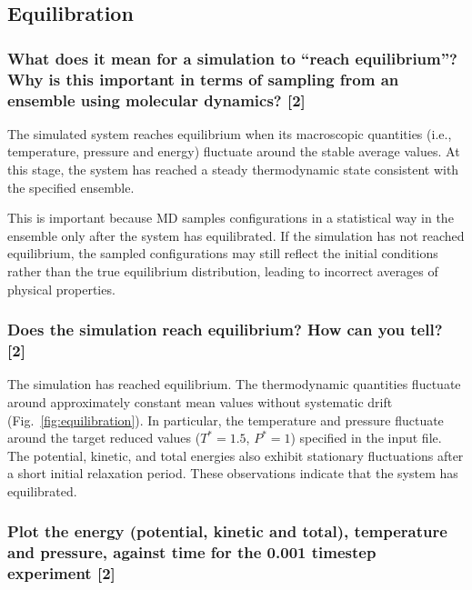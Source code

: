 \documentclass[a4paper,10pt,twocolumn]{article}
\begin{document}
\subsection{Equilibration}
\subsubsection*{What does it mean for a simulation to ``reach equilibrium''? Why is this important in terms of sampling from an ensemble using molecular dynamics? [2]}

The simulated system reaches equilibrium when its macroscopic quantities (i.e., temperature, pressure and energy) fluctuate around the stable average values. At this stage, the system has reached a steady thermodynamic state consistent with the specified ensemble.

This is important because MD samples configurations in a statistical way in the ensemble only after the system has equilibrated. If the simulation has not reached equilibrium, the sampled configurations may still reflect the initial conditions rather than the true equilibrium distribution, leading to incorrect averages of physical properties.


\subsubsection*{Does the simulation reach equilibrium? How can you tell? [2] }
The simulation has reached equilibrium. The thermodynamic quantities fluctuate around approximately constant mean values without systematic drift (Fig.~\ref{fig:equilibration}). In particular, the temperature and pressure fluctuate around the target reduced values ($T^* = 1.5$, $P^* = 1$) specified in the input file. The potential, kinetic, and total energies also exhibit stationary fluctuations after a short initial relaxation period. These observations indicate that the system has equilibrated.

\subsubsection*{
Plot the energy (potential, kinetic and total), temperature and pressure, against time for the 0.001 timestep experiment [2] }
\end{document}
